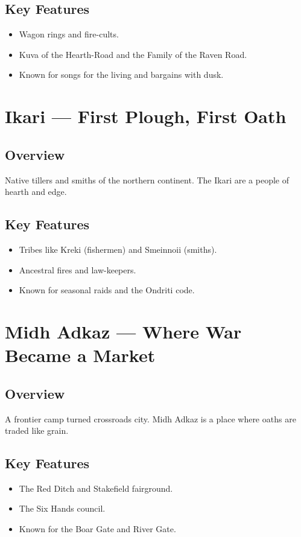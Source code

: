 \subsection*{Key Features}
\begin{itemize}[leftmargin=*]
    \item Wagon rings and fire-cults.
    \item Kuva of the Hearth-Road and the Family of the Raven Road.
    \item Known for songs for the living and bargains with dusk.
\end{itemize}

\section{Ikari — First Plough, First Oath}
\label{sec:lore-ikari}

\subsection*{Overview}
Native tillers and smiths of the northern continent. The Ikari are a people of hearth and edge.

\subsection*{Key Features}
\begin{itemize}[leftmargin=*]
    \item Tribes like Kreki (fishermen) and Smeinnoii (smiths).
    \item Ancestral fires and law-keepers.
    \item Known for seasonal raids and the Ondriti code.
\end{itemize}

\section{Midh Adkaz — Where War Became a Market}
\label{sec:lore-midh-adkaz}

\subsection*{Overview}
A frontier camp turned crossroads city. Midh Adkaz is a place where oaths are traded like grain.

\subsection*{Key Features}
\begin{itemize}[leftmargin=*]
    \item The Red Ditch and Stakefield fairground.
    \item The Six Hands council.
    \item Known for the Boar Gate and River Gate.
\end{itemize}

